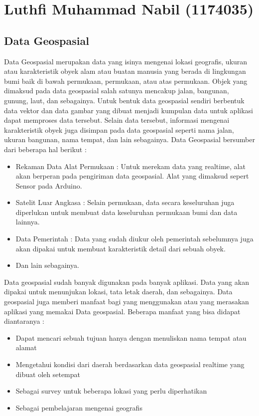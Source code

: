 \section{Luthfi Muhammad Nabil (1174035)}
\subsection{Data Geospasial}
Data Geospasial merupakan data yang isinya mengenai lokasi geografis, ukuran atau karakteristik obyek alam atau buatan manusia yang berada di lingkungan bumi baik di bawah permukaan, permukaan, atau atas permukaan\cite{mooney2016transportation}. Objek yang dimaksud pada data geospasial salah satunya mencakup jalan, bangunan, gunung, laut, dan sebagainya. Untuk bentuk data geospasial sendiri berbentuk data vektor dan data gambar yang dibuat menjadi kumpulan data untuk aplikasi dapat memproses data tersebut\cite{hoffman2019mapping}. Selain data tersebut, informasi mengenai karakteristik obyek juga disimpan pada data geospasial seperti nama jalan, ukuran bangunan, nama tempat, dan lain sebagainya\cite{barik2018fog}.
\break
Data Geospasial bersumber dari beberapa hal berikut : 
\begin{itemize}
	\item Rekaman Data Alat Permukaan : Untuk merekam data yang realtime, alat akan berperan pada pengiriman data geospasial. Alat yang dimaksud sepert Sensor pada Arduino.
	\item Satelit Luar Angkasa : Selain permukaan, data secara keseluruhan juga diperlukan untuk membuat data keseluruhan permukaan bumi dan data lainnya. 
	\item Data Pemerintah : Data yang sudah diukur oleh pemerintah sebelumnya juga akan dipakai untuk membuat karakteristik detail dari sebuah obyek. 
	\item Dan lain sebagainya.
\end{itemize}
Data geospasial sudah banyak digunakan pada banyak aplikasi\cite{lee2015geospatial}. Data yang akan dipakai untuk menunjukan lokasi, tata letak daerah, dan sebagainya. Data geospasial juga memberi manfaat bagi yang menggunakan atau yang merasakan aplikasi yang memakai Data geospasial. Beberapa manfaat yang bisa didapat diantaranya : 
\begin{itemize}
	\item Dapat mencari sebuah tujuan hanya dengan menuliskan nama tempat atau alamat
	\item Mengetahui kondisi dari daerah berdasarkan data geospasial realtime yang dibuat oleh setempat
	\item Sebagai survey untuk beberapa lokasi yang perlu diperhatikan
	\item Sebagai pembelajaran mengenai geografis
\end{itemize}
